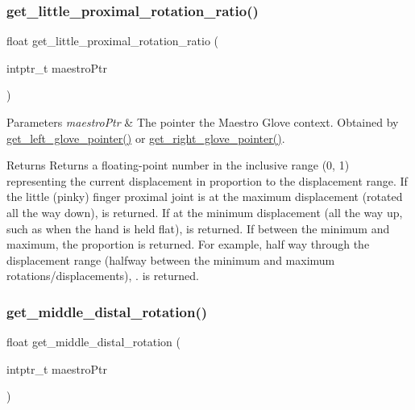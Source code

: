 \subsubsection{\texorpdfstring{get\+\_\+little\+\_\+proximal\+\_\+rotation\+\_\+ratio()}{get\_little\_proximal\_rotation\_ratio()}}
{\footnotesize\ttfamily float get\+\_\+little\+\_\+proximal\+\_\+rotation\+\_\+ratio (\begin{DoxyParamCaption}\item[{intptr\+\_\+t}]{maestro\+Ptr }\end{DoxyParamCaption})}


\begin{DoxyParams}{Parameters}
{\em maestro\+Ptr} & The pointer the Maestro Glove context. Obtained by \hyperlink{group__glove_management_ga63ce3c99d4a8b8db851b22af9185764e}{get\+\_\+left\+\_\+glove\+\_\+pointer()} or \hyperlink{group__glove_management_ga9b8fd9d91aeac3f8da50f7a7eba0c32b}{get\+\_\+right\+\_\+glove\+\_\+pointer()}. \\
\hline
\end{DoxyParams}
\begin{DoxyReturn}{Returns}
Returns a floating-\/point number in the inclusive range {\ttfamily (0, 1)} representing the current displacement in proportion to the displacement range. If the little (pinky) finger proximal joint is at the maximum displacement (rotated all the way down), {} is returned. If at the minimum displacement (all the way up, such as when the hand is held flat), {} is returned. If between the minimum and maximum, the proportion is returned. For example, half way through the displacement range (halfway between the minimum and maximum rotations/displacements), {.} is returned. 
\end{DoxyReturn}
\mbox{\label{group__rotation_access_gaddec3e0d8d07788424fc1d9b202472c4}} 
\subsubsection{\texorpdfstring{get\+\_\+middle\+\_\+distal\+\_\+rotation()}{get\_middle\_distal\_rotation()}}
{\footnotesize\ttfamily float get\+\_\+middle\+\_\+distal\+\_\+rotation (\begin{DoxyParamCaption}\item[{intptr\+\_\+t}]{maestro\+Ptr }\end{DoxyParamCaption})}


